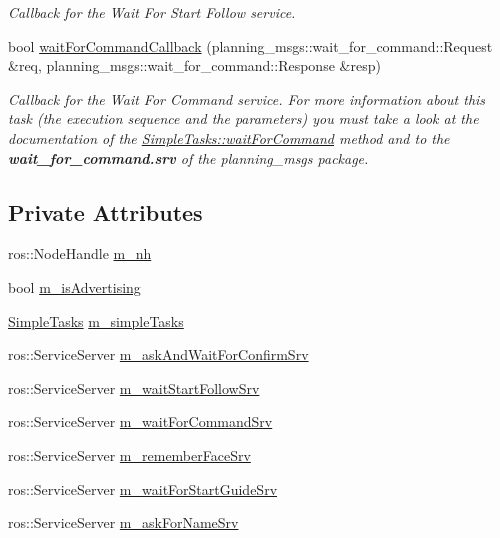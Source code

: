 \begin{DoxyCompactItemize}
\begin{DoxyCompactList}\small\item\em Callback for the Wait For Start Follow service. \end{DoxyCompactList}\item 
bool \hyperlink{class_task_advertiser_a1a150781421013d9c08d58e8700f9c88}{wait\+For\+Command\+Callback} (planning\+\_\+msgs\+::wait\+\_\+for\+\_\+command\+::\+Request \&req, planning\+\_\+msgs\+::wait\+\_\+for\+\_\+command\+::\+Response \&resp)
\begin{DoxyCompactList}\small\item\em Callback for the Wait For Command service. For more information about this task (the execution sequence and the parameters) you must take a look at the documentation of the \hyperlink{class_simple_tasks_ae9e4541c3e71d536b21e24c81f216235}{Simple\+Tasks\+::wait\+For\+Command} method and to the {\bfseries wait\+\_\+for\+\_\+command.\+srv} of the planning\+\_\+msgs package. \end{DoxyCompactList}\end{DoxyCompactItemize}
\subsection*{Private Attributes}
\begin{DoxyCompactItemize}
\item 
ros\+::\+Node\+Handle \hyperlink{class_task_advertiser_ac2b3e206897a243a661863c27fcf7e96}{m\+\_\+nh}
\item 
bool \hyperlink{class_task_advertiser_a399c52352a5d0663074e03ad6ecae4c3}{m\+\_\+is\+Advertising}
\item 
\hyperlink{class_simple_tasks}{Simple\+Tasks} \hyperlink{class_task_advertiser_acb092dd73221cb9c470e322e87530933}{m\+\_\+simple\+Tasks}
\item 
ros\+::\+Service\+Server \hyperlink{class_task_advertiser_a0e0bb754c07d002d62fdd0572dc85775}{m\+\_\+ask\+And\+Wait\+For\+Confirm\+Srv}
\item 
ros\+::\+Service\+Server \hyperlink{class_task_advertiser_a4d28e93a047d967b4a632a61ba94f314}{m\+\_\+wait\+Start\+Follow\+Srv}
\item 
ros\+::\+Service\+Server \hyperlink{class_task_advertiser_a57822e31555f279e363c19555ff01683}{m\+\_\+wait\+For\+Command\+Srv}
\item 
ros\+::\+Service\+Server \hyperlink{class_task_advertiser_af4a9ec62d358dd0bfadc7f14ea56976c}{m\+\_\+remember\+Face\+Srv}
\item 
ros\+::\+Service\+Server \hyperlink{class_task_advertiser_aa3dc53cedc6cdd30d2aa2fa26cd998c4}{m\+\_\+wait\+For\+Start\+Guide\+Srv}
\item 
ros\+::\+Service\+Server \hyperlink{class_task_advertiser_a6413b132f00fc7aec17edd1b9d59c07b}{m\+\_\+ask\+For\+Name\+Srv}
\end{DoxyCompactItemize}


